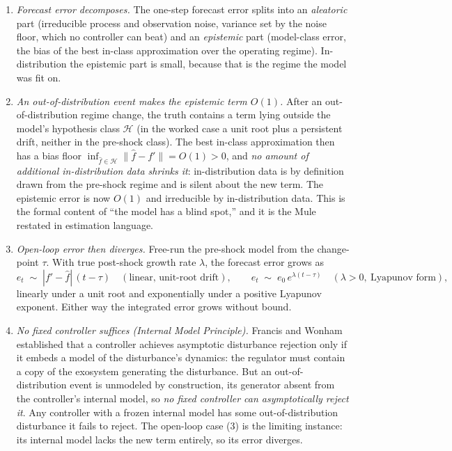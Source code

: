 \documentclass[11pt]{article}
\begin{document}
\begin{enumerate}[label=\arabic*.,itemsep=3pt]
\item \emph{Forecast error decomposes.} The one-step forecast error splits into an \emph{aleatoric} part (irreducible process and observation noise, variance set by the noise floor, which no controller can beat) and an \emph{epistemic} part (model-class error, the bias of the best in-class approximation over the operating regime). In-distribution the epistemic part is small, because that is the regime the model was fit on.
\item \emph{An out-of-distribution event makes the epistemic term $O(1)$.} After an out-of-distribution regime change, the truth contains a term lying outside the model's hypothesis class $\mathcal{H}$ (in the worked case a unit root plus a persistent drift, neither in the pre-shock class). The best in-class approximation then has a bias floor $\inf_{\hat f\in\mathcal{H}}\|\hat f - f'\| = O(1) > 0$, and \emph{no amount of additional in-distribution data shrinks it}: in-distribution data is by definition drawn from the pre-shock regime and is silent about the new term. The epistemic error is now $O(1)$ and irreducible by in-distribution data. This is the formal content of ``the model has a blind spot,'' and it is the Mule restated in estimation language.
\item \emph{Open-loop error then diverges.} Free-run the pre-shock model from the change-point $\tau$. With true post-shock growth rate $\lambda$, the forecast error grows as
\begin{equation}
e_t \;\sim\; |f' - \hat f|\,(t-\tau)\quad(\text{linear, unit-root drift}),
\qquad
e_t \;\sim\; e_0\,e^{\lambda(t-\tau)}\quad(\lambda>0,\ \text{Lyapunov form}),
\label{eq:openloop}
\end{equation}
linearly under a unit root and exponentially under a positive Lyapunov exponent. Either way the integrated error grows without bound.
\item \emph{No fixed controller suffices (Internal Model Principle).} Francis and Wonham \cite{franciswonham1976} established that a controller achieves asymptotic disturbance rejection only if it embeds a model of the disturbance's dynamics: the regulator must contain a copy of the exosystem generating the disturbance. But an out-of-distribution event is unmodeled by construction, its generator absent from the controller's internal model, so \emph{no fixed controller can asymptotically reject it}. Any controller with a frozen internal model has some out-of-distribution disturbance it fails to reject. The open-loop case (3) is the limiting instance: its internal model lacks the new term entirely, so its error diverges.

\end{enumerate}
\end{document}
